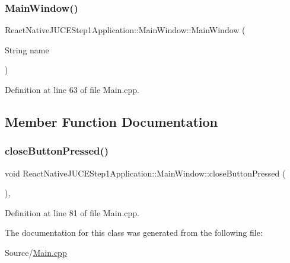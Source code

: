 \subsubsection{\texorpdfstring{Main\+Window()}{MainWindow()}}
{\footnotesize\ttfamily React\+Native\+J\+U\+C\+E\+Step1\+Application\+::\+Main\+Window\+::\+Main\+Window (\begin{DoxyParamCaption}\item[{String}]{name }\end{DoxyParamCaption})\hspace{0.3cm}{\ttfamily [inline]}}



Definition at line 63 of file Main.\+cpp.



\subsection{Member Function Documentation}
\mbox{\label{class_react_native_j_u_c_e_step1_application_1_1_main_window_a46285ddeeb829fd29e5498e504c0e615}} 
\subsubsection{\texorpdfstring{close\+Button\+Pressed()}{closeButtonPressed()}}
{\footnotesize\ttfamily void React\+Native\+J\+U\+C\+E\+Step1\+Application\+::\+Main\+Window\+::close\+Button\+Pressed (\begin{DoxyParamCaption}{ }\end{DoxyParamCaption})\hspace{0.3cm}{\ttfamily [inline]}, {\ttfamily [override]}}



Definition at line 81 of file Main.\+cpp.



The documentation for this class was generated from the following file\+:\begin{DoxyCompactItemize}
\item 
Source/\mbox{\hyperlink{_main_8cpp}{Main.\+cpp}}\end{DoxyCompactItemize}
